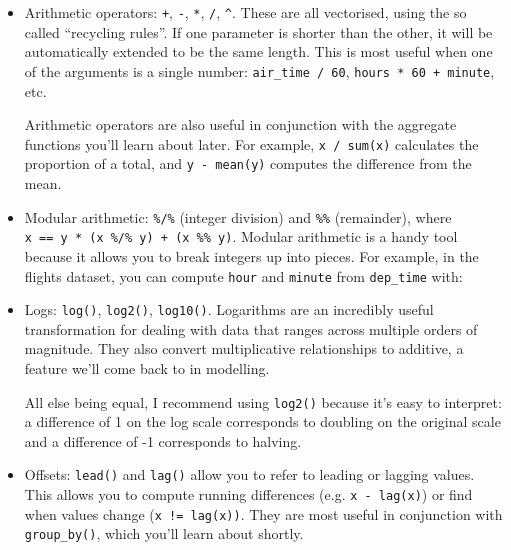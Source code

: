 \documentclass[]{book}
\newenvironment{Shaded}{\begin{snugshade}}{\end{snugshade}}
\newcommand{\KeywordTok}[1]{\textcolor[rgb]{0.13,0.29,0.53}{\textbf{{#1}}}}
\newcommand{\DataTypeTok}[1]{\textcolor[rgb]{0.13,0.29,0.53}{{#1}}}
\newcommand{\DecValTok}[1]{\textcolor[rgb]{0.00,0.00,0.81}{{#1}}}
\newcommand{\StringTok}[1]{\textcolor[rgb]{0.31,0.60,0.02}{{#1}}}
\newcommand{\CommentTok}[1]{\textcolor[rgb]{0.56,0.35,0.01}{\textit{{#1}}}}
\newcommand{\NormalTok}[1]{{#1}}
\begin{document}
\begin{itemize}
\item
  Arithmetic operators: \texttt{+}, \texttt{-}, \texttt{*}, \texttt{/},
  \texttt{\^{}}. These are all vectorised, using the so called
  ``recycling rules''. If one parameter is shorter than the other, it
  will be automatically extended to be the same length. This is most
  useful when one of the arguments is a single number:
  \texttt{air\_time\ /\ 60}, \texttt{hours\ *\ 60\ +\ minute}, etc.

  Arithmetic operators are also useful in conjunction with the aggregate
  functions you'll learn about later. For example, \texttt{x\ /\ sum(x)}
  calculates the proportion of a total, and \texttt{y\ -\ mean(y)}
  computes the difference from the mean.
\item
  Modular arithmetic: \texttt{\%/\%} (integer division) and
  \texttt{\%\%} (remainder), where
  \texttt{x\ ==\ y\ *\ (x\ \%/\%\ y)\ +\ (x\ \%\%\ y)}. Modular
  arithmetic is a handy tool because it allows you to break integers up
  into pieces. For example, in the flights dataset, you can compute
  \texttt{hour} and \texttt{minute} from \texttt{dep\_time} with:

\begin{Shaded}
\end{Shaded}
\item
  Logs: \texttt{log()}, \texttt{log2()}, \texttt{log10()}. Logarithms
  are an incredibly useful transformation for dealing with data that
  ranges across multiple orders of magnitude. They also convert
  multiplicative relationships to additive, a feature we'll come back to
  in modelling.

  All else being equal, I recommend using \texttt{log2()} because it's
  easy to interpret: a difference of 1 on the log scale corresponds to
  doubling on the original scale and a difference of -1 corresponds to
  halving.
\item
  Offsets: \texttt{lead()} and \texttt{lag()} allow you to refer to
  leading or lagging values. This allows you to compute running
  differences (e.g. \texttt{x\ -\ lag(x)}) or find when values change
  (\texttt{x\ !=\ lag(x))}. They are most useful in conjunction with
  \texttt{group\_by()}, which you'll learn about shortly.


\end{itemize}
\end{document}
